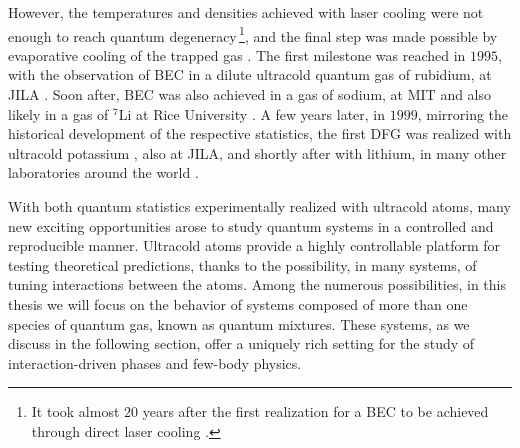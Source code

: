 However, the temperatures and densities achieved with laser cooling were not enough to reach quantum degeneracy\,\footnote{It took almost $20$ years after the first realization for a \ac{BEC} to be achieved through direct laser cooling \cite{Stellmer2013lct}.}, and the final step was made possible by evaporative cooling of the trapped gas \cite{Hess1986eco, Ketterle1996eco}.
The first milestone was reached in $1995$, with the observation of \ac{BEC} in a dilute ultracold quantum gas of rubidium, at JILA \cite{Anderson1995oob}. Soon after, \ac{BEC} was also achieved in a gas of sodium, at MIT \cite{Davis1995bec}  and also likely in a gas of $^7$Li at Rice University \cite{Bradley1995eob, Bradley1997bec}. A few years later, in $1999$, mirroring the historical development of the respective statistics, the first \ac{DFG} was realized with ultracold potassium \cite{DeMarco1999oof}, also at JILA, and shortly after with lithium, in many other laboratories around the world  \cite{Truscott2001oof, Schreck2001qbe, Hadzibabic2002tsm, Jochim2004PhD}.

With both quantum statistics experimentally realized with ultracold atoms, many new exciting opportunities arose to study quantum systems in a controlled and reproducible manner. Ultracold atoms provide a highly controllable platform for testing theoretical predictions, thanks to the possibility, in many systems, of tuning interactions between the atoms. Among the numerous possibilities, in this thesis we will focus on the behavior of systems composed of more than one species of quantum gas, known as quantum mixtures. These systems, as we discuss in the following section, offer a uniquely rich setting for the study of interaction-driven phases and few-body physics.






 
 




